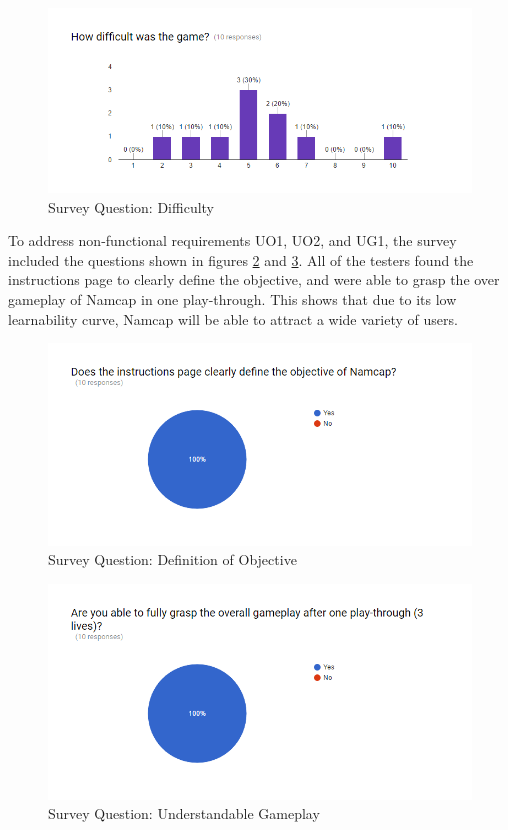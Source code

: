 \documentclass[12pt, titlepage]{article}
\begin{document}
\begin{figure}[H]
\centering
\includegraphics[width=1.0\textwidth]{SurveyQuestion3.png}
\caption{Survey Question: Difficulty}
\label{FigSQ3}
\end{figure}

\noindent To address non-functional requirements UO1, UO2, and UG1, the survey included the questions shown in figures \ref{FigSQ6} and \ref{FigSQ7}. All of the testers found the instructions page to clearly define the objective, and were able to grasp the over gameplay of Namcap in one play-through. This shows that due to its low learnability curve, Namcap will be able to attract a wide variety of users.

\begin{figure}[H]
\centering
\includegraphics[width=1.0\textwidth]{SurveyQuestion6.png}
\caption{Survey Question: Definition of Objective}
\label{FigSQ6}
\end{figure}

\begin{figure}[H]
\centering
\includegraphics[width=1.0\textwidth]{SurveyQuestion7.png}
\caption{Survey Question: Understandable Gameplay}
\label{FigSQ7}
\end{figure}
\end{document}
